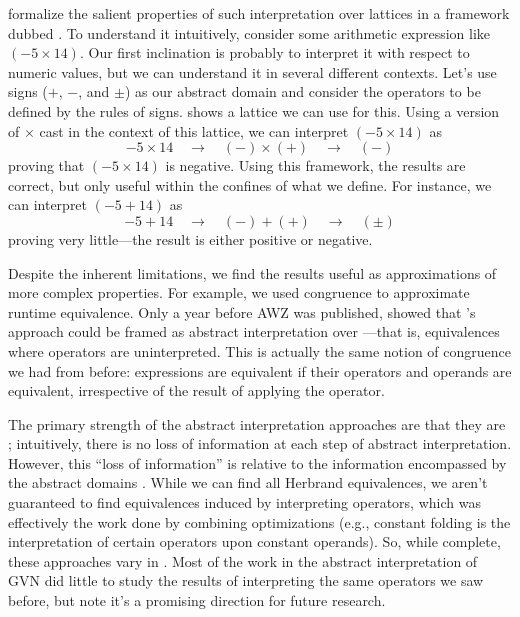 \citeauthor{Cousot} formalize the salient properties of such interpretation
over lattices in a framework dubbed .  To
understand it intuitively, consider some arithmetic expression like $(-5 \times
14)$.  Our first inclination is probably to interpret it with respect to
numeric values, but we can understand it in several different contexts.  Let's
use signs ($+$, $-$, and $\pm$) as our abstract domain and consider the
operators to be defined by the rules of signs.   shows a
lattice we can use for this.  Using a version of $\times$ cast in the context
of this lattice, we can interpret $(-5 \times 14)$ as
%
$$-5 \times 14 \quad\to\quad (-) \times (+) \quad\to\quad (-)$$
%
proving that $(-5 \times 14)$ is negative.  Using this framework, the results
are correct, but only useful within the confines of what we define.  For
instance, we can interpret $(-5 + 14)$ as
%
$$-5 + 14 \quad\to\quad (-) + (+) \quad\to\quad (\pm)$$
%
proving very little---the result is either positive or negative.

Despite the inherent limitations, we find the results useful as approximations
of more complex properties.  For example, we used congruence to approximate
runtime equivalence.  Only a year before AWZ was published,
\citeauthor{Steffen} \autocite*{Steffen} showed that \citeauthor{Kildall}'s
approach could be framed as abstract interpretation over ---that is, equivalences where operators are uninterpreted.  This
is actually the same notion of congruence we had from before: expressions are
equivalent if their operators and operands are equivalent, irrespective of the
result of applying the operator.

The primary strength of the abstract interpretation approaches are that they
are ; intuitively, there is no loss of information at each step
of abstract interpretation.  However, this ``loss of information'' is relative
to the information encompassed by the abstract domains \autocite{Completeness}.
While we can find all Herbrand equivalences, we aren't guaranteed to find
equivalences induced by interpreting operators, which was effectively the work
done by combining optimizations (e.g., constant folding is the interpretation
of certain operators upon constant operands).  So, while complete, these
approaches vary in .  Most of the work in the abstract
interpretation of \gls{GVN} did little to study the results of interpreting the
same operators we saw before, but note it's a promising direction for future
research.

